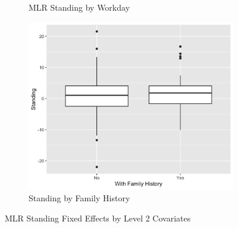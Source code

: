 \documentclass[12pt,twoside,letterpaper]{article}
\theoremstyle{definition}
\theoremstyle{definition}
\begin{document}
\begin{figure}
\begin{subfigure}[b]{0.32\textwidth}
                \caption[]%
                {{\small MLR Standing by Workday}}
                \label{fig: stand v day}
                \end{subfigure}
                \hfill
                \begin{subfigure}[b]{0.32\textwidth}
                \centering
                \includegraphics[width=\textwidth]{pics/mlr stand by fh.png}
                \caption[]%
                {{\small Standing by Family History}}
                \label{fig: int v fh}
                \end{subfigure}
                \caption[]
                {\small MLR Standing Fixed Effects by Level 2 Covariates}
                \label{fig: stand v lv2}
                \end{figure}
            
\end{document}
